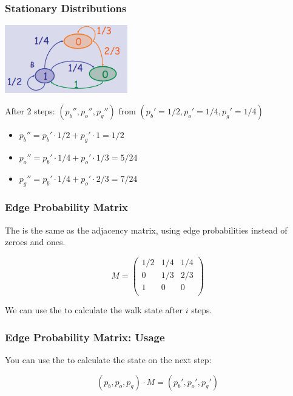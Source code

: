 \documentclass{beamer}
\begin{document}
\begin{frame}
  \frametitle{Stationary Distributions}

  \begin{center}
    \includegraphics[width=0.4\textwidth]{../img/probgraph_walk}
  \end{center}

  \bigskip
  
  {\larger After 2 steps: \alert{$(p_b'', p_o'', p_g'')$} from $(p_b' = 1/2,
    p_o' = 1/4, p_g' = 1/4)$
    \begin{itemize}
    \item $p_b'' = p_b'\cdot 1/2 + p_g'\cdot 1 = 1/2$
    \item $p_o'' = p_b'\cdot 1/4 + p_o'\cdot 1/3 = 5/24$
    \item $p_g'' = p_b'\cdot 1/4 + p_o'\cdot 2/3 = 7/24$
    \end{itemize}
  }
\end{frame}

\begin{frame}
  \frametitle{Edge Probability Matrix}

  {\larger
  The  is the same as the adjacency
  matrix, \alert{using edge probabilities instead of zeroes and ones}.
  
  \bigskip
  
  \begin{equation*}
    M = \left(\begin{matrix}
    1/2 & 1/4 & 1/4 \\
    0 & 1/3 & 2/3 \\
    1 & 0 & 0 \\
    \end{matrix}\right)
  \end{equation*}

  \bigskip
  
  We can use the  to calculate the
  walk state after $i$ steps.
  }
\end{frame}

\begin{frame}
  \frametitle{Edge Probability Matrix: Usage}

  {\larger

    You can use the  to calculate the
    state on the next step:

    \bigskip

    \begin{equation*}
      (p_b,p_o,p_g)\cdot M = (p_b',p_o',p_g')
    \end{equation*}
  }
\end{frame}
\end{document}
